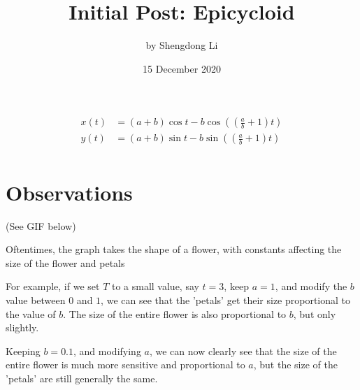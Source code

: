 \documentclass[12pt]{article}
\begin{document}
\title{Initial Post: Epicycloid}
\author{by Shengdong Li}
\date{15 December 2020}
\maketitle

\begin{align*}
  x(t) & =\left(a+b\right)\cos t-b\cos\left(\left(\frac{a}{b}+1\right)t\right) \\
  y(t) & =\left(a+b\right)\sin t-b\sin\left(\left(\frac{a}{b}+1\right)t\right) \\
\end{align*}

\section{Observations}
(See GIF below)

Oftentimes, the graph takes the shape of a flower, with constants affecting the size of the flower and petals

For example, if we set $T$ to a small value, say $t=3$, keep $a=1$, and modify the $b$ value between $0$ and $1$, we can see that the 'petals' get their size proportional to the value of $b$. The size of the entire flower is also proportional to $b$, but only slightly.

Keeping $b=0.1$, and modifying $a$, we can now clearly see that the size of the entire flower is much more sensitive and proportional to $a$, but the size of the 'petals' are still generally the same.
\end{document}
